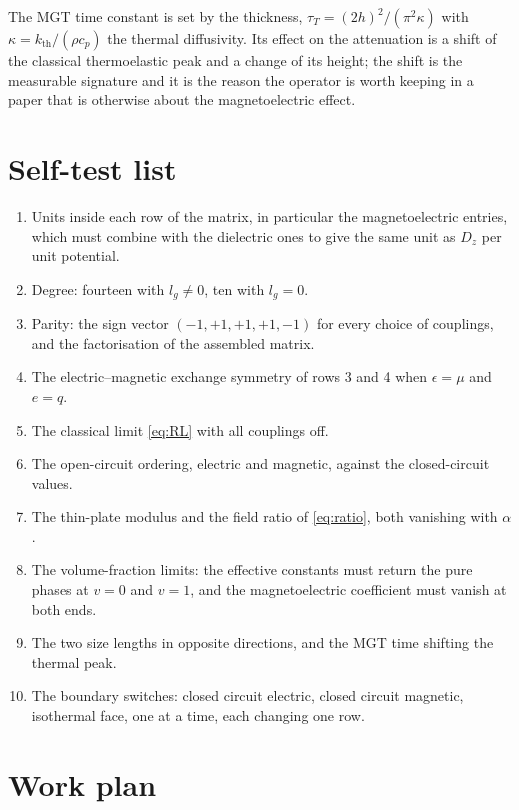 \documentclass[11pt,a4paper]{article}
\newcommand{\kB}{k_{\mathrm{th}}}
\newcommand{\aME}{\alpha}
\begin{document}
\noindent The MGT time constant is set by the thickness, $\tau_T=(2h)^2/(\pi^2\kappa)$ with $\kappa=\kB/(\rho
c_p)$ the thermal diffusivity. Its effect on the attenuation is a shift of the classical thermoelastic peak
and a change of its height; the shift is the measurable signature and it is the reason the operator is worth
keeping in a paper that is otherwise about the magnetoelectric effect.

\section{Self-test list}\label{sec:tests}

\begin{enumerate}
\item Units inside each row of the matrix, in particular the magnetoelectric entries, which must combine
with the dielectric ones to give the same unit as $D_z$ per unit potential.
\item Degree: fourteen with $l_g\ne0$, ten with $l_g=0$.
\item Parity: the sign vector $(-1,+1,+1,+1,-1)$ for every choice of couplings, and the factorisation of the
assembled matrix.
\item The electric--magnetic exchange symmetry of rows 3 and 4 when $\epsilon=\mu$ and $e=q$.
\item The classical limit \eqref{eq:RL} with all couplings off.
\item The open-circuit ordering, electric and magnetic, against the closed-circuit values.
\item The thin-plate modulus and the field ratio of \eqref{eq:ratio}, both vanishing with $\aME$.
\item The volume-fraction limits: the effective constants must return the pure phases at $v=0$ and $v=1$,
and the magnetoelectric coefficient must vanish at both ends.
\item The two size lengths in opposite directions, and the MGT time shifting the thermal peak.
\item The boundary switches: closed circuit electric, closed circuit magnetic, isothermal face, one at a
time, each changing one row.
\end{enumerate}

\section{Work plan}
\end{document}

